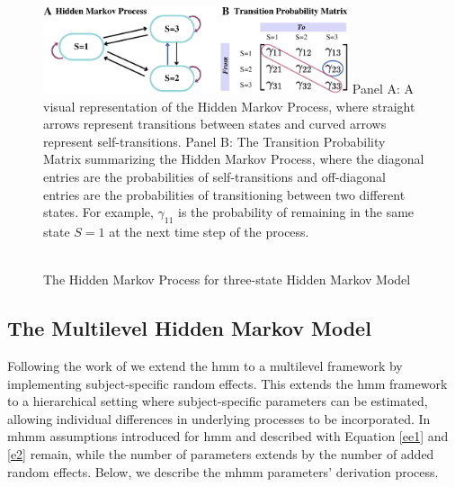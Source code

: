 
\begin{figure}[h]
\caption{\\The Hidden Markov Process for three-state Hidden Markov Model}
\centering
\includegraphics[width=0.8\textwidth]{graphics/time_hmm_s2.pdf}
\flushleft
\footnotesize
\justifying
Panel A: A visual representation of the Hidden Markov Process, where straight arrows represent transitions between states and curved arrows represent self-transitions. Panel B: The Transition Probability Matrix summarizing the Hidden Markov Process, where the diagonal entries are the probabilities of self-transitions and off-diagonal entries are the probabilities of transitioning between two different states. For example, $\gamma_{11}$ is the probability of remaining in the same state $S=1$ at the next time step of the process.
 \label{hmm_fig2}
\end{figure}

\subsection{The Multilevel Hidden Markov Model}
Following the work of \cite{altman_mixed_2007} we extend the \ac{hmm} to a multilevel framework by implementing subject-specific random effects. This extends the \ac{hmm} framework \linebreak to a hierarchical setting where subject-specific parameters can be estimated, allowing individual differences in underlying processes to be incorporated. In \ac{mhmm} assumptions introduced for \ac{hmm} and described with Equation \ref{ee1} and \ref{e2} remain, while the number of parameters extends by the number of added random effects. Below, we describe the \ac{mhmm} parameters' derivation process. 

